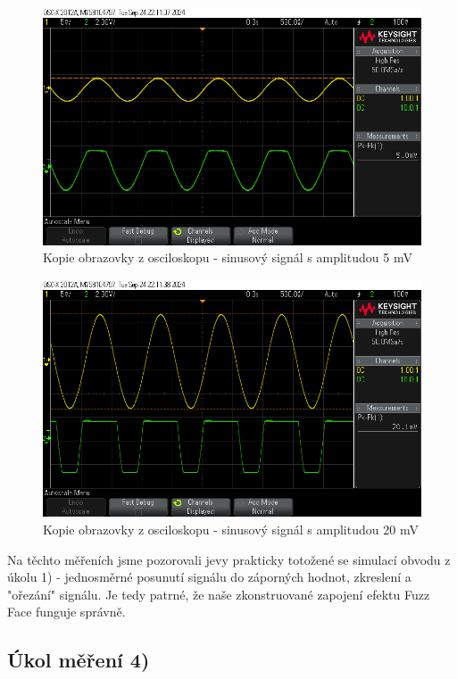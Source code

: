 \documentclass[a4paper, czech]{article}
\begin{document}
\begin{figure}[H]
    \centering
    \includegraphics[width=\linewidth]{5_osciloskop.png}
    \caption{Kopie obrazovky z osciloskopu - sinusový signál s amplitudou 5 mV}
\end{figure}

\begin{figure}[H]
    \centering
    \includegraphics[width=\linewidth]{6_osciloskop.png}
    \caption{Kopie obrazovky z osciloskopu - sinusový signál s amplitudou 20 mV}
\end{figure}

Na těchto měřeních jsme pozorovali jevy prakticky totožené se simulací obvodu z úkolu 1) - jednosměrné posunutí signálu do záporných hodnot, zkreslení a "ořezání" signálu.
Je tedy patrné, že naše zkonstruované zapojení efektu Fuzz Face funguje správně. 

\subsection{Úkol měření 4)}
\end{document}

